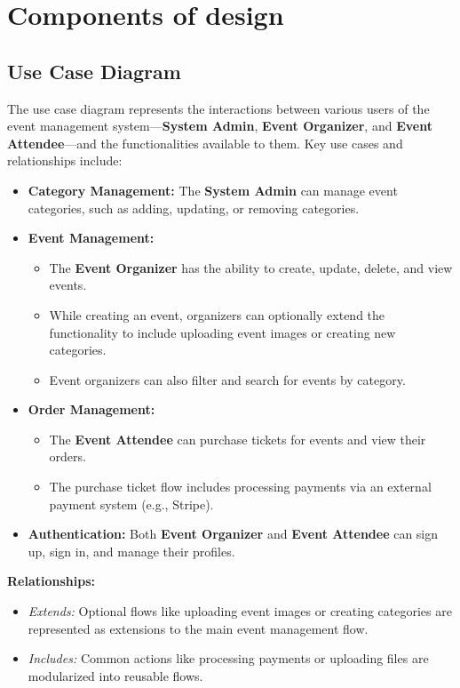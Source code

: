 \section{Components of design}

\subsection{Use Case Diagram}
The use case diagram represents the interactions between various users of the event management system—\textbf{System Admin}, \textbf{Event Organizer}, and \textbf{Event Attendee}—and the functionalities available to them. Key use cases and relationships include:  

\begin{itemize}
    \item \textbf{Category Management:}  
    The \textbf{System Admin} can manage event categories, such as adding, updating, or removing categories.  

    \item \textbf{Event Management:}  
    \begin{itemize}
        \item The \textbf{Event Organizer} has the ability to create, update, delete, and view events.  
        \item While creating an event, organizers can optionally extend the functionality to include uploading event images or creating new categories.  
        \item Event organizers can also filter and search for events by category.  
    \end{itemize}

    \item \textbf{Order Management:}  
    \begin{itemize}
        \item The \textbf{Event Attendee} can purchase tickets for events and view their orders.  
        \item The purchase ticket flow includes processing payments via an external payment system (e.g., Stripe).  
    \end{itemize}

    \item \textbf{Authentication:}  
    Both \textbf{Event Organizer} and \textbf{Event Attendee} can sign up, sign in, and manage their profiles.  
\end{itemize}

\textbf{Relationships:}  
\begin{itemize}
    \item \textit{Extends:} Optional flows like uploading event images or creating categories are represented as extensions to the main event management flow.  
    \item \textit{Includes:} Common actions like processing payments or uploading files are modularized into reusable flows.  
\end{itemize}

